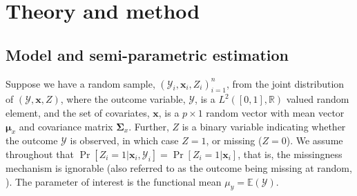 \documentclass[12pt, A4]{article}
\newcommand{\ObsCov}{\textbf{x}_i}
\newcommand{\Parentheses}[1]{ \left( #1 \right) }
\begin{document}
    \section{Theory and method}
        \subsection{Model and semi-parametric estimation}
        Suppose we have a random sample, $(\mathcal{Y}_i, \ObsCov, Z_i)_{i=1}^n$, from the joint distribution of $(\mathcal{Y}, \textbf{x}, Z)$, where the outcome variable, $\mathcal{Y}$, is a $L^2([0,1], \mathbb{R})$ valued random element, and the set of covariates, $\textbf{x}$, is a $p \times 1$ random vector with mean vector $\boldsymbol{\mu}_x$ and covariance matrix $\boldsymbol{\Sigma}_x$. 
        Further, $Z$ is a binary variable indicating whether the outcome $\mathcal{Y}$ is observed, in which case $Z=1$, or missing ($Z=0$). 
        We assume throughout that $\Pr[ Z_i=1 | \ObsCov, \mathcal{Y}_i] = \Pr[ Z_i=1 | \ObsCov ]$, that is, the missingness mechanism is ignorable (also referred to as the outcome being missing at random, \cite[][Chap 6]{tsiatis2006semiparametric}). 
        The parameter of interest is the functional mean $\mu_{y} = \mathbb{E}\Parentheses{\mathcal{Y}}$.
\end{document}

